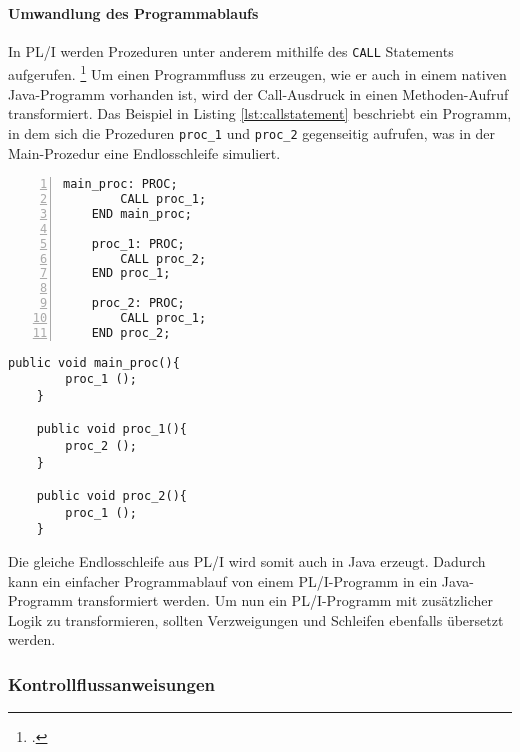 \pagebreak
\paragraph{Umwandlung des Programmablaufs}

In PL/I werden Prozeduren unter anderem mithilfe des \verb+CALL+ Statements aufgerufen. \footcite[Vgl. ][S.133ff. ]{pliref} Um einen Programmfluss zu erzeugen, wie er auch in einem nativen Java-Programm vorhanden ist, wird der Call-Ausdruck in einen Methoden-Aufruf transformiert. 
Das Beispiel in Listing \ref{lst:callstatement} beschriebt ein Programm, in dem sich die Prozeduren \verb+proc_1+ und \verb+proc_2+ gegenseitig aufrufen, was in der Main-Prozedur eine Endlosschleife simuliert.

\begin{minipage}[b]{0.48\linewidth}
	\centering
	\lstset{language=PL/I,label=SliceExaple}
	\begin{lstlisting}[frame=single, numbers=left, mathescape,%
		caption={Prozeduraufruf}, label={lst:callstatement}]
	main_proc: PROC;
		CALL proc_1;
	END main_proc;
		
	proc_1: PROC;
		CALL proc_2;
	END proc_1;
		
	proc_2: PROC;
		CALL proc_1;
	END proc_2;
	\end{lstlisting}
\end{minipage}
\hspace{0.5cm}
\begin{minipage}[b]{0.48\linewidth}
	\centering
	\lstset{language=Java,label=SliceExaple}
	\begin{lstlisting}[frame=single, mathescape,%
		title={" "}]
	public void main_proc(){
		proc_1 ();
	}
		
	public void proc_1(){
		proc_2 ();
	}
		
	public void proc_2(){
		proc_1 ();
	}
	\end{lstlisting}
\end{minipage}


Die gleiche Endlosschleife aus PL/I wird somit auch in Java erzeugt.
Dadurch kann ein einfacher Programmablauf von einem PL/I-Programm in ein Java-Programm transformiert werden.
Um nun ein PL/I-Programm mit zusätzlicher Logik zu transformieren, sollten Verzweigungen und Schleifen ebenfalls übersetzt werden.

\pagebreak
\subsubsection{Kontrollflussanweisungen}
